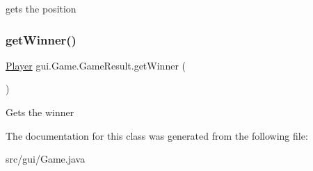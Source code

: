gets the position \mbox{\label{classgui_1_1_game_1_1_game_result_a916cdc5d16f546a3606bfaa7ca22cc39}} 
\subsubsection{\texorpdfstring{get\+Winner()}{getWinner()}}
{\footnotesize\ttfamily \mbox{\hyperlink{classplayers_1_1_player}{Player}} gui.\+Game.\+Game\+Result.\+get\+Winner (\begin{DoxyParamCaption}{ }\end{DoxyParamCaption})}

Gets the winner 

The documentation for this class was generated from the following file\+:\begin{DoxyCompactItemize}
\item 
src/gui/Game.\+java\end{DoxyCompactItemize}
